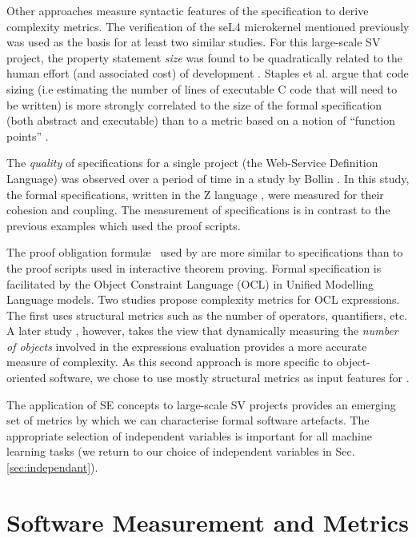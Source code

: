 Other approaches measure syntactic features of the specification to derive complexity metrics. The verification of the seL4 microkernel mentioned previously was used as the basis for at least two similar studies. For this large-scale SV project, the property statement \textit{size} was found to be quadratically related to the human effort (and associated cost) of development \cite{CostIndicator}. Staples et al. argue that code sizing (i.e estimating the number of lines of executable C code that will need to be written) is more strongly correlated to the size of the formal specification (both abstract and executable) than to a metric based on a notion of ``function points'' \cite{Staples:2013}.
   
The \textit{quality} of specifications for a single project (the Web-Service Definition Language) was observed over a period of time in a study by Bollin \cite{Zspecs}. In this study, the formal specifications, written in the Z language \cite{Zlang}, were measured for their cohesion and coupling. The measurement of specifications is in contrast to the previous examples \cite{Aspinall2016, CostIndicator} which used the proof scripts.

The proof obligation formul\ae~ used by \where are more similar to specifications than to the proof scripts used in interactive theorem proving.  
Formal specification is facilitated by the Object Constraint Language (OCL) in Unified Modelling Language models. 
Two studies propose complexity metrics for OCL expressions. 
The first \cite{TowardsOCL} uses structural metrics such as the number of operators, quantifiers, etc. 
A later study \cite{OCLalt}, however, takes the view that dynamically measuring the \textit{number of objects} involved in the expressions evaluation provides a more accurate measure of complexity. 
As this second approach is more specific to object-oriented software, we chose to use mostly structural metrics as input features for \where.

The application of SE concepts to large-scale SV projects provides an emerging set of metrics by which we can characterise formal software artefacts.   
The appropriate selection of independent variables is important for all machine learning tasks (we return to our choice of independent variables in Sec. \ref{sec:independant}). 
       
\section{Software Measurement and Metrics}
\label{sec:lrmm}

